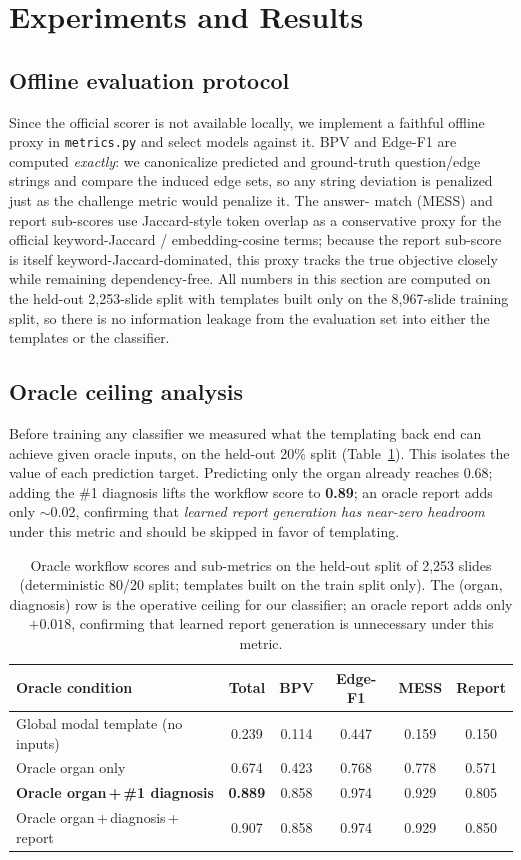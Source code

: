 \documentclass[11pt,a4paper]{article}
\newcommand{\code}[1]{\texttt{\small #1}}
\begin{document}
\section{Experiments and Results}
\label{sec:results}

\subsection{Offline evaluation protocol}
Since the official scorer is not available locally, we implement a faithful offline proxy in
\code{metrics.py} and select models against it. BPV and Edge-F1 are computed \emph{exactly}: we
canonicalize predicted and ground-truth question/edge strings and compare the induced edge sets,
so any string deviation is penalized just as the challenge metric would penalize it. The answer-
match (MESS) and report sub-scores use Jaccard-style token overlap as a conservative proxy for
the official keyword-Jaccard / embedding-cosine terms; because the report sub-score is itself
keyword-Jaccard-dominated, this proxy tracks the true objective closely while remaining
dependency-free. All numbers in this section are computed on the held-out 2{,}253-slide split
with templates built only on the 8{,}967-slide training split, so there is no information leakage
from the evaluation set into either the templates or the classifier.

\subsection{Oracle ceiling analysis}
Before training any classifier we measured what the templating back end can achieve given
oracle inputs, on the held-out 20\% split (Table~\ref{tab:oracle}). This isolates the value of
each prediction target. Predicting only the organ already reaches 0.68; adding the \#1
diagnosis lifts the workflow score to \textbf{0.89}; an oracle report adds only $\sim$0.02,
confirming that \emph{learned report generation has near-zero headroom} under this metric and
should be skipped in favor of templating.

\begin{table}[h]
\centering
\caption{Oracle workflow scores and sub-metrics on the held-out split of 2{,}253 slides
(deterministic 80/20 split; templates built on the train split only). The (organ, diagnosis)
row is the operative ceiling for our classifier; an oracle report adds only $+0.018$, confirming
that learned report generation is unnecessary under this metric.}
\label{tab:oracle}
\begin{tabular}{lccccc}
\toprule
Oracle condition & Total & BPV & Edge-F1 & MESS & Report \\
\midrule
Global modal template (no inputs) & 0.239 & 0.114 & 0.447 & 0.159 & 0.150 \\
Oracle organ only & 0.674 & 0.423 & 0.768 & 0.778 & 0.571 \\
\textbf{Oracle organ\,+\,\#1 diagnosis} & \textbf{0.889} & 0.858 & 0.974 & 0.929 & 0.805 \\
Oracle organ\,+\,diagnosis\,+\,report & 0.907 & 0.858 & 0.974 & 0.929 & 0.850 \\
\bottomrule
\end{tabular}
\end{table}
\end{document}
